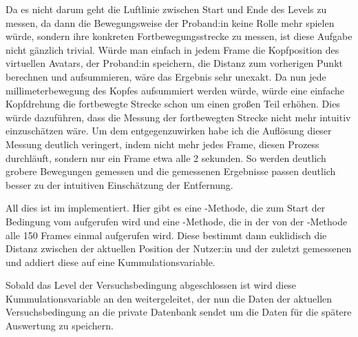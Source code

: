 Da es nicht darum geht die Luftlinie zwischen Start und Ende des Levels zu messen, da dann die Bewegungsweise der Proband:in keine Rolle mehr spielen würde, sondern ihre konkreten Fortbewegungsstrecke zu messen, ist diese Aufgabe nicht gänzlich trivial. Würde man einfach in jedem Frame die Kopfposition des virtuellen Avatars, der Proband:in speichern, die Distanz zum vorherigen Punkt berechnen und aufsummieren, wäre das Ergebnis sehr unexakt. %
Da nun jede millimeterbewegung des Kopfes aufsummiert werden würde, würde eine einfache Kopfdrehung die fortbewegte Strecke schon um einen großen Teil erhöhen. Dies würde dazuführen, dass die Messung der fortbewegten Strecke nicht mehr intuitiv einzuschätzen wäre.
Um dem entgegenzuwirken habe ich die Auflösung dieser Messung deutlich veringert, indem nicht mehr jedes Frame, diesen Prozess durchläuft, sondern nur ein Frame etwa alle 2 sekunden. So werden deutlich grobere Bewegungen gemessen und die gemessenen Ergebnisse passen deutlich besser zu der intuitiven Einschätzung der Entfernung.

All dies ist im  implementiert. Hier gibt es eine -Methode, die zum Start der Bedingung vom  aufgerufen wird und eine -Methode, die in der von der -Methode alle 150 Frames einmal aufgerufen wird. Diese bestimmt dann euklidisch die Distanz zwischen der aktuellen Position der Nutzer:in und der zuletzt gemessenen und addiert diese auf eine Kummulationsvariable.

Sobald das Level der Versuchsbedingung abgeschlossen ist wird diese Kummulationsvariable an den  weitergeleitet, der nun die Daten der aktuellen Versuchsbedingung an die private Datenbank sendet um die Daten für die spätere Auswertung zu speichern.

